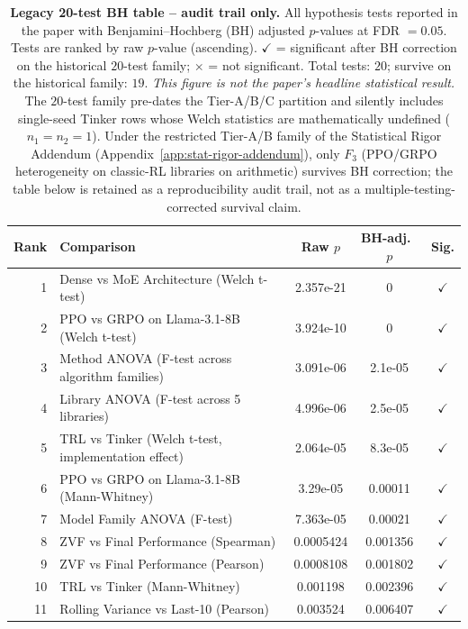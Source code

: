 \documentclass{article}
\begin{document}
\begin{table}[!ht]
\centering
\caption{\textbf{Legacy 20-test BH table -- audit trail only.} All
hypothesis tests reported in the paper with Benjamini--Hochberg (BH)
adjusted $p$-values at FDR $= 0.05$.  Tests are ranked by raw
$p$-value (ascending). $\checkmark$ = significant after BH correction
on the historical $20$-test family; $\times$ = not significant. Total
tests: $20$; survive on the historical family: $19$. \emph{This
figure is not the paper's headline statistical result.} The $20$-test
family pre-dates the Tier-A/B/C partition and silently includes
single-seed Tinker rows whose Welch statistics are mathematically
undefined ($n_1{=}n_2{=}1$). Under the restricted Tier-A/B family of
the Statistical Rigor Addendum (Appendix~\ref{app:stat-rigor-addendum}),
only $F_3$ (PPO/GRPO heterogeneity on classic-RL libraries on
arithmetic) survives BH correction; the table below is retained as a
reproducibility audit trail, not as a multiple-testing-corrected
survival claim.}
\label{tab:bh-pvalues}
\scriptsize
\begin{tabular}{@{}rp{6.2cm}ccc@{}}
\toprule
Rank & Comparison & Raw $p$ & BH-adj.\ $p$ & Sig. \\
\midrule
        1 & Dense vs MoE Architecture (Welch t-test) & 2.357e-21 & 0 & $\checkmark$ \\
        2 & PPO vs GRPO on Llama-3.1-8B (Welch t-test) & 3.924e-10 & 0 & $\checkmark$ \\
        3 & Method ANOVA (F-test across algorithm families) & 3.091e-06 & 2.1e-05 & $\checkmark$ \\
        4 & Library ANOVA (F-test across 5 libraries) & 4.996e-06 & 2.5e-05 & $\checkmark$ \\
        5 & TRL vs Tinker (Welch t-test, implementation effect) & 2.064e-05 & 8.3e-05 & $\checkmark$ \\
        6 & PPO vs GRPO on Llama-3.1-8B (Mann-Whitney) & 3.29e-05 & 0.00011 & $\checkmark$ \\
        7 & Model Family ANOVA (F-test) & 7.363e-05 & 0.00021 & $\checkmark$ \\
        8 & ZVF vs Final Performance (Spearman) & 0.0005424 & 0.001356 & $\checkmark$ \\
        9 & ZVF vs Final Performance (Pearson) & 0.0008108 & 0.001802 & $\checkmark$ \\
        10 & TRL vs Tinker (Mann-Whitney) & 0.001198 & 0.002396 & $\checkmark$ \\
        11 & Rolling Variance vs Last-10 (Pearson) & 0.003524 & 0.006407 & $\checkmark$ \\

\end{tabular}
\end{table}
\end{document}
